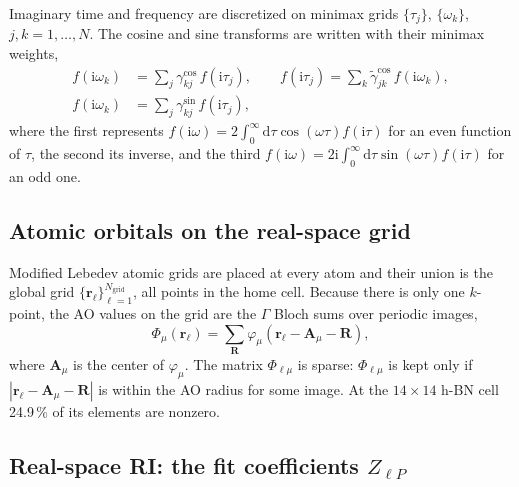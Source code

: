 \documentclass[%
 reprint,
superscriptaddress,
 amsmath,amssymb,
 aps,
prb,
]{revtex4-2}
\newcommand{\br}{\mathbf{r}}
\newcommand{\bR}{\mathbf{R}}
\newcommand{\dd}{\mathrm{d}}
\newcommand{\ii}{\mathrm{i}}
\begin{document}
Imaginary time and frequency are discretized on minimax grids $\{\tau_j\}$, $\{\omega_k\}$,
$j,k = 1,\dots,N$. The cosine and sine transforms are written with their minimax weights,
\begin{equation}
\begin{aligned}
  f(\ii\omega_k) &= \sum_j \gamma^{\cos}_{kj}\, f(\ii\tau_j),\qquad
  f(\ii\tau_j) = \sum_k \tilde\gamma^{\cos}_{jk}\, f(\ii\omega_k),\\
  f(\ii\omega_k) &= \sum_j \gamma^{\sin}_{kj}\, f(\ii\tau_j),
\end{aligned}
  \label{eq:transforms}
\end{equation}
where the first represents $f(\ii\omega) = 2\int_0^\infty\dd\tau\cos(\omega\tau)f(\ii\tau)$ for
an even function of $\tau$, the second its inverse, and the third
$f(\ii\omega) = 2\ii\int_0^\infty\dd\tau\sin(\omega\tau)f(\ii\tau)$ for an odd one.

\subsection{Atomic orbitals on the real-space grid}
\label{sec:grid}

Modified Lebedev atomic grids are placed at every atom and their union is the global grid
$\{\br_\ell\}_{\ell=1}^{N_\mathrm{grid}}$, all points in the home cell. Because there is only one
$k$-point, the AO values on the grid are the $\Gamma$ Bloch sums over periodic images,
\begin{equation}
  \Phi_{\mu}(\br_\ell) = \sum_{\bR} \varphi_\mu(\br_\ell - \mathbf A_\mu - \bR),
  \label{eq:phi_grid}
\end{equation}
where $\mathbf A_\mu$ is the center of $\varphi_\mu$. The matrix $\Phi_{\ell\mu}$ is sparse:
$\Phi_{\ell\mu}$ is kept only if $|\br_\ell-\mathbf A_\mu-\bR|$ is within the AO radius for some
image. At the $14\times14$ h-BN cell 24.9\,\% of its elements are nonzero.

\subsection{Real-space RI: the fit coefficients $Z_{\ell P}$}
\label{sec:rirs}
\end{document}
